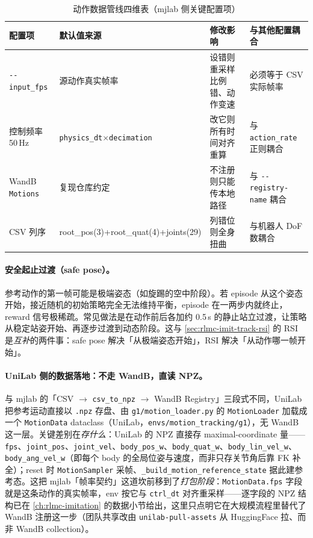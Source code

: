 \begin{table}[ht]
\centering
\small
\caption{动作数据管线四维表（mjlab 侧关键配置项）}
\label{tab:rlmc-mi-datacfg}
\begin{tabular}{@{}p{2.4cm}p{2.6cm}p{3.2cm}p{3.4cm}@{}}
\toprule
配置项 & 默认值来源 & 修改影响 & 与其他配置耦合 \\
\midrule
\verb|--input_fps| & 源动作真实帧率 & 设错则重采样比例错、动作变速 & 必须等于 CSV 实际帧率 \\
控制频率 50\,Hz & \verb|physics_dt|$\times$\verb|decimation| & 改它则所有时间对齐重算 & 与 \verb|action_rate| 正则耦合 \\
WandB \texttt{Motions} & 复现仓库约定 & 不注册则只能传本地路径 & 与 \verb|--registry-name| 耦合 \\
CSV 列序 & root\_pos(3)+root\_quat(4)+joints(29) & 列错位则全身扭曲 & 与机器人 DoF 数耦合 \\
\bottomrule
\end{tabular}
\end{table}

\paragraph{安全起止过渡（safe pose）。}参考动作的第一帧可能是极端姿态（如旋踢的空中阶段）。若 episode 从这个姿态开始，接近随机的初始策略完全无法维持平衡，episode 在一两步内就终止，reward 信号极稀疏。常见做法是在动作前后各加约 0.5\,s 的静止站立过渡，让策略从稳定站姿开始、再逐步过渡到动态阶段。这与 \cref{sec:rlmc-imit-track-rsi} 的 RSI 是\emph{互补}的两件事：safe pose 解决「从极端姿态开始」，RSI 解决「从动作哪一帧开始」。

\paragraph{UniLab 侧的数据落地：不走 WandB，直读 NPZ。}与 mjlab 的「CSV $\to$ \texttt{csv\_to\_npz} $\to$ WandB Registry」三段式不同，UniLab 把参考运动直接以 \verb|.npz| 存盘、由 \verb|g1/motion_loader.py| 的 \verb|MotionLoader| 加载成一个 \verb|MotionData| dataclass（UniLab，\verb|envs/motion_tracking/g1|），无 WandB 这一层。关键差别在\emph{存什么}：UniLab 的 NPZ 直接存 maximal-coordinate 量——\verb|fps|、\verb|joint_pos|、\verb|joint_vel|、\verb|body_pos_w|、\verb|body_quat_w|、\verb|body_lin_vel_w|、\verb|body_ang_vel_w|（即每个 body 的全局位姿与速度，而非只存关节角后靠 FK 补全）；reset 时 \verb|MotionSampler| 采帧、\verb|_build_motion_reference_state| 据此建参考态。这把 mjlab「帧率契约」这道坎前移到了\emph{打包阶段}：\verb|MotionData.fps| 字段就是这条动作的真实帧率，env 按它与 \verb|ctrl_dt| 对齐重采样——逐字段的 NPZ 结构已在 \cref{ch:rlmc-imitation} 的数据小节给出，这里只点明它在大规模流程里替代了 WandB 注册这一步（团队共享改由 \verb|unilab-pull-assets| 从 HuggingFace 拉、而非 WandB collection）。

